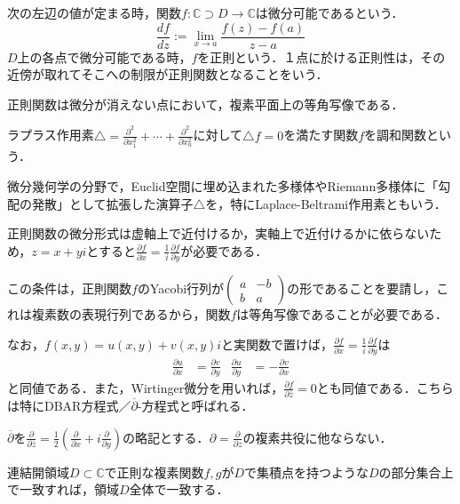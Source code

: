 \documentclass[uplatex, dvipdfmx]{jsreport}
\begin{document}
\begin{definition}[正則関数]
    次の左辺の値が定まる時，関数$f:\mathbb{C}\supset D\to\mathbb{C}$は微分可能であるという．
    \[ \frac{df}{dz} := \lim_{x\to a}\frac{f(z)-f(a)}{z-a} \]
    $D$上の各点で微分可能である時，$f$を正則という．１点に於ける正則性は，その近傍が取れてそこへの制限が正則関数となることをいう．
\end{definition}
\begin{remark}
    正則関数は微分が消えない点において，複素平面上の等角写像である．
\end{remark}
\begin{definition}[調和関数]
    ラプラス作用素$\bigtriangleup =\frac{\partial^2}{\partial x^2_1}+\cdots+\frac{\partial^2}{\partial x^2_n}$に対して$\bigtriangleup f=0$を満たす関数$f$を調和関数という．
\end{definition}
\begin{remark}
    微分幾何学の分野で，Euclid空間に埋め込まれた多様体やRiemann多様体に「勾配の発散」として拡張した演算子$\bigtriangleup$を，特にLaplace-Beltrami作用素ともいう．
\end{remark}
\begin{definition}
    正則関数の微分形式は虚軸上で近付けるか，実軸上で近付けるかに依らないため，$z=x+yi$とすると$\frac{\partial f}{\partial x}=\frac{1}{i}\frac{\partial f}{\partial y}$が必要である．

    この条件は，正則関数$f$のYacobi行列が$\begin{pmatrix}a&-b\\b&a\end{pmatrix}$の形であることを要請し，これは複素数の表現行列であるから，関数$f$は等角写像であることが必要である．

    なお，$f(x,y)=u(x,y)+v(x,y)i$と実関数で置けば，$\frac{\partial f}{\partial x}=\frac{1}{i}\frac{\partial f}{\partial y}$は
    \begin{align*}
        \frac{\partial u}{\partial x} &= \frac{\partial v}{\partial y} & \frac{\partial u}{\partial y} &= -\frac{\partial v}{\partial x}
    \end{align*}
    と同値である．また，Wirtinger微分を用いれば，$\frac{\partial f}{\partial\overline{z}}=0$とも同値である．こちらは特にDBAR方程式／$\overline{\partial}$-方程式と呼ばれる．
\end{definition}
\begin{notation}[D bar]
    $\overline{\partial}$を$\frac{\partial}{\partial\overline{z}}=\frac{1}{2}\left( \frac{\partial}{\partial x}+i\frac{\partial}{\partial y} \right)$の略記とする．$\partial=\frac{\partial}{\partial z}$の複素共役に他ならない．
\end{notation}
\begin{theorem}\label{thm-identity-theorem}
    連結開領域$D\subset\mathbb{C}$で正則な複素関数$f,g$が$D$で集積点を持つような$D$の部分集合上で一致すれば，領域$D$全体で一致する．
\end{theorem}
\end{document}
